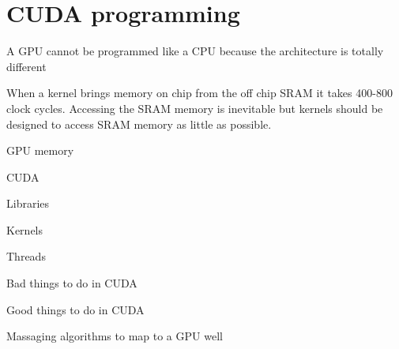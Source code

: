 \section{CUDA programming}

%

A GPU cannot be programmed like a CPU because the architecture is totally different

When a kernel brings memory on chip from the off chip SRAM it takes 400-800 clock cycles.
Accessing the SRAM memory is inevitable but kernels should be designed to access SRAM memory as little as possible.

GPU memory

CUDA

Libraries

Kernels

Threads

Bad things to do in CUDA

Good things to do in CUDA

Massaging algorithms to map to a GPU well


